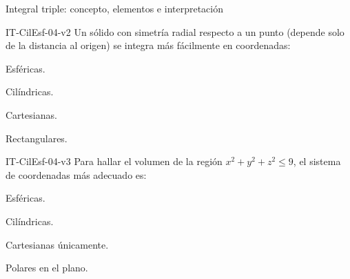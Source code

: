 \documentclass[a4,11pt]{aleph-notas}
\begin{document}
\begin{quiz}{Integral triple: concepto, elementos e interpretación}
\begin{multi}[]%
    {IT-CilEsf-04-v2}
    Un sólido con simetría radial respecto a un punto (depende solo de la distancia al origen) se integra más fácilmente en coordenadas:
    \item* Esféricas.
    \item Cilíndricas.
    \item Cartesianas.
    \item Rectangulares.
\end{multi}

\begin{multi}[]%
    {IT-CilEsf-04-v3}
    Para hallar el volumen de la región $x^2+y^2+z^2\leq 9$, el sistema de coordenadas más adecuado es:
    \item* Esféricas.
    \item Cilíndricas.
    \item Cartesianas únicamente.
    \item Polares en el plano.
\end{multi}

\end{quiz}
\end{document}
